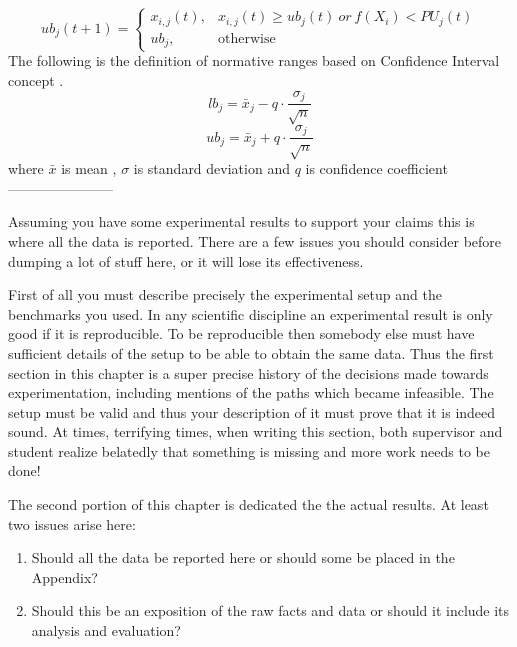 \begin{equation}
ub_{j}(t+1) = \begin{cases} x_{i,j}(t), & x_{i,j}(t)\ge ub_{j}(t)\:or\:f(X_{i})<PU_{j}(t)  \\ ub_{j}, & \mbox{otherwise} \end{cases} 
\end{equation}%
The following is the definition of normative ranges based on Confidence Interval concept \cite{proakis1985probability}.
\begin{equation}
lb_{j}=\bar{x}_{j}-q\cdot\dfrac{\sigma_{j}}{\sqrt{n}}
\end{equation}
\begin{equation}
ub_{j}=\bar{x}_{j}+q\cdot\dfrac{\sigma_{j}}{\sqrt{n}}
\end{equation}
where 
$\bar{x}$ is mean , $\sigma$ is standard deviation and $q$ is confidence coefficient \newline
\newline ----------------------- \newline





Assuming you have some experimental results to support your claims this is where all the data is reported. There are a few issues you should consider before dumping a lot of stuff here, or it will lose its effectiveness.

First of all you must describe precisely the experimental setup and the benchmarks you used. In any scientific discipline an experimental result is only good if it is reproducible. To be reproducible then somebody else must have sufficient details of the setup to be able to obtain the same data. Thus the first section in this chapter is a super precise history of the decisions made towards experimentation, including mentions of the paths which became infeasible. The setup must be valid and thus your description of it must prove that it is indeed sound. At times, terrifying times, when writing this section, both supervisor and student realize belatedly that something is missing and more work needs to be done!

The second portion of this chapter is dedicated the the actual results. At least two issues arise here:
\begin{enumerate}
\item {Should all the data be reported here or should some be placed in the Appendix?}
\item {Should this be an exposition of the raw facts and data or should it include its analysis and evaluation?}
\end{enumerate}

